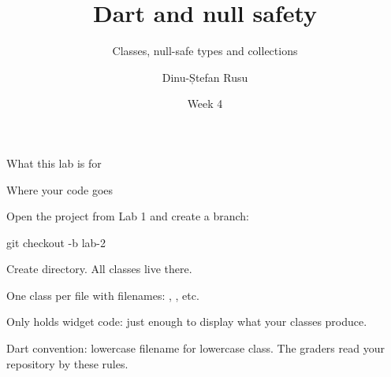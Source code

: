 \documentclass[10pt,aspectratio=169,t]{beamer}
\title{Dart and null safety}
\subtitle{Classes, null-safe types and collections}
\author{Dinu-Ștefan Rusu}
\institute{FILS, Universitatea Politehnica București}
\date{Week 4}
\begin{document}
\titleframe

\begin{frame}[eyebrow=Today]{What this lab is for}
  \vskip 2mm
  \begin{grid}[2]
  \end{grid}
  \vskip 6mm
\end{frame}

\begin{frame}[fragile,eyebrow=Setup]{Where your code goes}
  \begin{steps}
    \item Open the project from Lab 1 and create a branch:
\begin{shell}
git checkout -b lab-2
\end{shell}
    \item Create  directory. All classes live there.
    \item One class per file with  filenames: , , etc.
    \item Only  holds widget code: just enough to display what your classes produce.
  \end{steps}
  \begin{hint}
    Dart convention: lowercase filename for lowercase class. The graders read your repository by these rules.
  \end{hint}
\end{frame}
\end{document}
